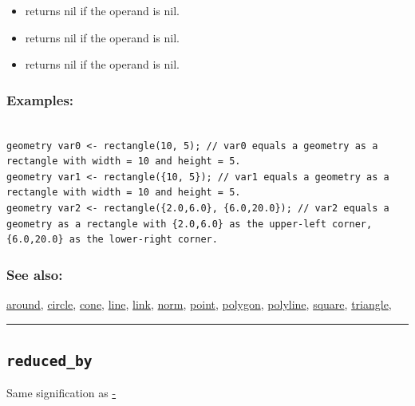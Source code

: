 \documentclass[]{book}
\providecommand{\tightlist}{%
  \setlength{\itemsep}{0pt}\setlength{\parskip}{0pt}}
\theoremstyle{definition}
\theoremstyle{definition}
\theoremstyle{definition}
\theoremstyle{remark}
\begin{document}
\begin{itemize}
\tightlist
\item
  returns nil if the operand is nil.\\
\item
  returns nil if the operand is nil.\\
\item
  returns nil if the operand is nil.
\end{itemize}

\subsubsection{Examples:}\label{examples-295}

\begin{verbatim}
 
geometry var0 <- rectangle(10, 5); // var0 equals a geometry as a rectangle with width = 10 and height = 5. 
geometry var1 <- rectangle({10, 5}); // var1 equals a geometry as a rectangle with width = 10 and height = 5. 
geometry var2 <- rectangle({2.0,6.0}, {6.0,20.0}); // var2 equals a geometry as a rectangle with {2.0,6.0} as the upper-left corner, {6.0,20.0} as the lower-right corner.
\end{verbatim}

\subsubsection{See also:}\label{see-also-172}

\href{operators-a-to-a.html\#around}{around},
\href{operators-b-to-c.html\#circle}{circle},
\href{operators-b-to-c.html\#cone}{cone},
\href{operators-i-to-m.html\#line}{line},
\href{operators-i-to-m.html\#link}{link},
\href{operators-n-to-r.html\#norm}{norm},
\href{operators-n-to-r.html\#point}{point},
\href{operators-n-to-r.html\#polygon}{polygon},
\href{operators-n-to-r.html\#polyline}{polyline},
\href{operators-s-to-z.html\#square}{square},
\href{operators-s-to-z.html\#triangle}{triangle},

\begin{center}\rule{0.5\linewidth}{\linethickness}\end{center}

\subsection{\texorpdfstring{\texttt{reduced\_by}}{reduced\_by}}\label{reduced_by}

Same signification as \href{operators-a-to-a.html\#-}{-}
\end{document}
